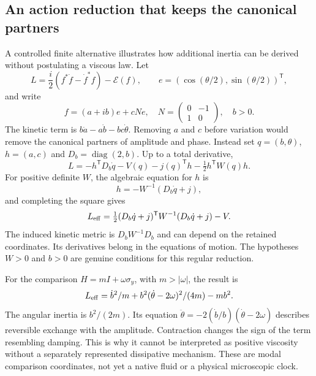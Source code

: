 \documentclass[11pt,a4paper]{article}
\begin{document}
\subsection{An action reduction that keeps the canonical partners}
A controlled finite alternative illustrates how additional inertia
can be derived without postulating a viscous law. Let
\begin{equation}
 L=\frac i2(f^*\dot f-\dot f^*f)-\mathcal E(f),\qquad
 e=(\cos(\theta/2),\sin(\theta/2))^{\mathsf T},
\end{equation}
and write
\begin{equation}
 f=(a+ib)e+cNe,\quad
 N=\begin{pmatrix}0&-1\\1&0\end{pmatrix},\quad b>0.
\end{equation}
The kinetic term is
$b\dot a-a\dot b-bc\dot\theta$. Removing $a$ and $c$ before
variation would remove the canonical partners of amplitude and
phase. Instead set $q=(b,\theta)$, $h=(a,c)$ and
$D_b=\operatorname{diag}(2,b)$. Up to a total derivative,
\begin{equation}
 L=-h^{\mathsf T}D_b\dot q-
       V(q)-j(q)^{\mathsf T}h-\tfrac12h^{\mathsf T}W(q)h.
\end{equation}
For positive definite $W$, the algebraic equation for $h$ is
\begin{equation}
 h=-W^{-1}(D_b\dot q+j),
\end{equation}
and completing the square gives
\begin{equation}
 L_{\rm eff}=\tfrac12(D_b\dot q+j)^{\mathsf T}
                    W^{-1}(D_b\dot q+j)-V.
\end{equation}
The induced kinetic metric is $D_bW^{-1}D_b$ and can depend on
the retained coordinates. Its derivatives belong in the equations
of motion. The hypotheses $W>0$ and $b>0$ are genuine conditions
for this regular reduction.

For the comparison $H=mI+\omega\sigma_y$, with $m>|\omega|$,
the result is
\begin{equation}
 L_{\rm eff}=\dot b^2/m+
       b^2(\dot\theta-2\omega)^2/(4m)-mb^2.
\end{equation}
The angular inertia is $b^2/(2m)$. Its equation
$\ddot\theta=-2(\dot b/b)(\dot\theta-2\omega)$ describes
reversible exchange with the amplitude. Contraction changes the sign
of the term resembling damping. This is why it cannot be interpreted
as positive viscosity without a separately represented dissipative
mechanism. These are modal comparison coordinates, not yet a native
fluid or a physical microscopic clock.
\end{document}
